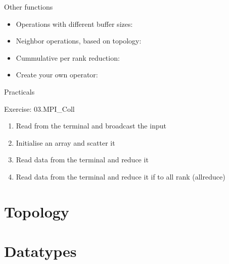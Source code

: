 \documentclass[aspectratio=43]{beamer}
\begin{document}
\begin{frame}[fragile]{Other functions}
\begin{itemize}
    \item Operations with different buffer sizes:\\\hspace{1cm}
    \item Neighbor operations, based on topology:\\\hspace{1cm}
    \item Cummulative per rank reduction:\\\hspace{1cm}
    \item Create your own operator:\\\hspace{1cm}
\end{itemize}
\end{frame}

\begin{frame}{Practicals}
    \begin{brown2block}{Exercise: 03.MPI\_Coll}
    \begin{enumerate}
        \item Read from the terminal and broadcast the input
        \item Initialise an array and scatter it
        \item Read data from the terminal and reduce it
        \item Read data from the terminal and reduce it if to all rank (allreduce)
    \end{enumerate}
    \end{brown2block}
\end{frame}

\section{Topology}
\section{Datatypes}

\end{document}
